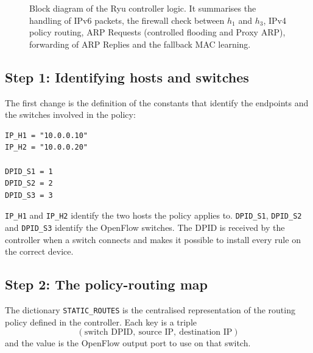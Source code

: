 \documentclass[11pt,a4paper]{article}
\newcommand{\code}[1]{\texttt{#1}}
\begin{document}
\begin{figure}[H]
\caption{Block diagram of the Ryu controller logic. It summarises the handling
of IPv6 packets, the firewall check between $h_1$ and $h_3$, IPv4 policy routing,
ARP Requests (controlled flooding and Proxy ARP), forwarding of ARP Replies and
the fallback MAC learning.}
\label{fig:flowchart}
\end{figure}

\subsection{Step 1: Identifying hosts and switches}
The first change is the definition of the constants that identify the endpoints
and the switches involved in the policy:

\begin{lstlisting}[style=py,caption={Constants for Task 3}]
IP_H1 = "10.0.0.10"
IP_H2 = "10.0.0.20"

DPID_S1 = 1
DPID_S2 = 2
DPID_S3 = 3
\end{lstlisting}

\code{IP\_H1} and \code{IP\_H2} identify the two hosts the policy applies to.
\code{DPID\_S1}, \code{DPID\_S2} and \code{DPID\_S3} identify the OpenFlow
switches. The DPID is received by the controller when a switch connects and
makes it possible to install every rule on the correct device.

\subsection{Step 2: The policy-routing map}
The dictionary \code{STATIC\_ROUTES} is the centralised representation of the
routing policy defined in the controller. Each key is a triple
\[
  (\text{switch DPID},\ \text{source IP},\ \text{destination IP})
\]
and the value is the OpenFlow output port to use on that switch.
\end{document}

